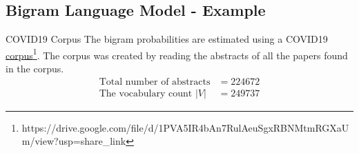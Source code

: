 \subsection{Bigram Language Model - Example}
\begin{frame}{COVID19 Corpus}
The bigram probabilities are estimated using a COVID19 \href{https://drive.google.com/file/d/1PVA5IR4bAn7RulAeuSgxRBNMtmRGXaUm/view?usp=share_link}{corpus}\footnote{https://drive.google.com/file/d/1PVA5IR4bAn7RulAeuSgxRBNMtmRGXaUm/view?usp=share\_link}. The corpus was created by reading the abstracts of all the papers found in the corpus.
\small
\begin{align}
\text{Total number of abstracts} &= 224672\nonumber\\
\text{The  vocabulary count }  |V| &= 249737 \nonumber
\end{align}

\end{frame}

